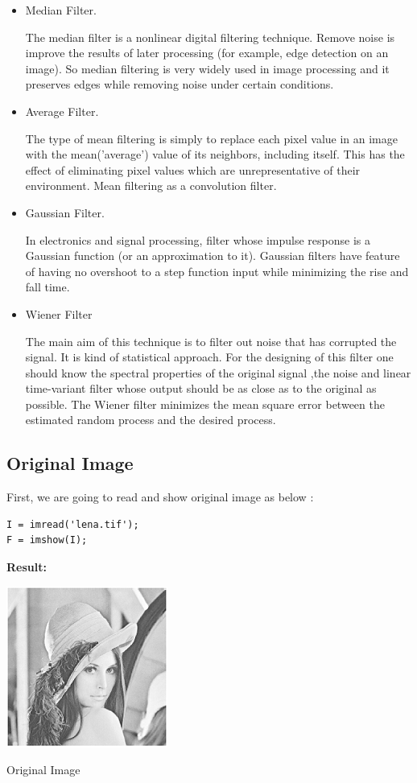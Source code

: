 \documentclass[10pt]{article}
\begin{document}
\begin{itemize}
	\item  Median Filter.

The median filter is a nonlinear digital filtering technique.  Remove noise is improve the results of later processing (for example, edge detection on an image). So median filtering is very widely used in image processing and it preserves edges while removing noise under certain conditions.

	\item  Average Filter.
	
	The type of mean filtering is simply to replace each pixel value in an image with the mean('average') value of its neighbors, including itself. This has the effect of eliminating pixel values which are
	unrepresentative of their environment. Mean filtering as a convolution filter.
	
	\item  Gaussian Filter.
	
	In electronics and signal processing, filter whose impulse response is a Gaussian function (or an approximation to it). Gaussian filters have feature of having no overshoot to a step function input while minimizing the rise and fall time.

	\item Wiener Filter
	
	The main aim of this technique is to filter out noise that has corrupted the signal. It is kind of statistical approach. For the designing of this filter one should know the spectral properties of the original signal ,the noise and linear time-variant filter whose output should be as close as to the original as possible. The Wiener filter minimizes the mean square error between the estimated random process and the desired process.
	



\end{itemize}

 \subsection{Original Image }
First, we are going to read and show original image as below :
\begin{lstlisting}
I = imread('lena.tif');
F = imshow(I);
\end{lstlisting}

\textbf{Result:}
\begin{center}
	\includegraphics{lena1.png}

 Original Image
\end{center}
\end{document}
